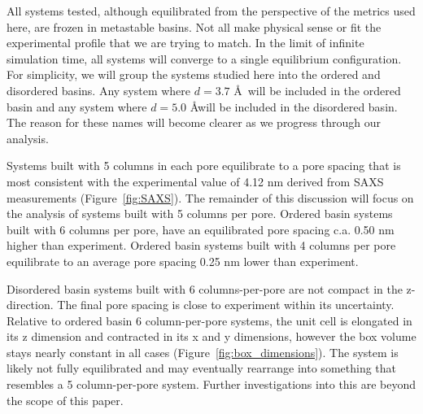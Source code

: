 \documentclass[journal=jpcbfk,manusciprt=article]{achemso}
\begin{document}
  All systems tested, although equilibrated from the perspective of the metrics used here, are
  frozen in metastable basins. Not all make physical sense or fit the experimental profile that 
  we are trying to match. In the limit of infinite simulation time, all systems will converge to
  a single equilibrium configuration. For simplicity, we will group the systems studied here into
  the ordered and disordered basins. Any system where $\mathit{d}=3.7$ \AA~will be included in the
  ordered basin and any system where $\mathit{d}=5.0$ \AA will be included in the disordered basin.
  The reason for these names will become clearer as we progress through our analysis.
  
  
  Systems built with 5 columns in each pore equilibrate to a pore spacing that is most 
  consistent with the experimental value of 4.12 nm derived from SAXS measurements 
  (Figure~\ref{fig:SAXS}). The remainder of this discussion will focus on the analysis of
  systems built with 5 columns per pore. Ordered basin systems built with 6 columns per pore,
  have an equilibrated pore spacing c.a. 0.50 nm higher than experiment. Ordered basin systems
  built with 4 columns per pore equilibrate to an average pore spacing 0.25 nm lower than experiment. 
  
  Disordered basin systems built with 6 columns-per-pore are not compact in the z-direction.
  The final pore spacing is close to experiment within its uncertainty. Relative to ordered basin 
  6 column-per-pore systems, the unit cell is elongated in its z dimension and contracted in its
  x and y dimensions, however the box volume stays nearly constant in all cases 
  (Figure~\ref{fig:box_dimensions}). The system is likely not fully equilibrated and may eventually
  rearrange into something that resembles a 5 column-per-pore system. Further investigations 
  into this are beyond the scope of this paper.
  
\end{document}

